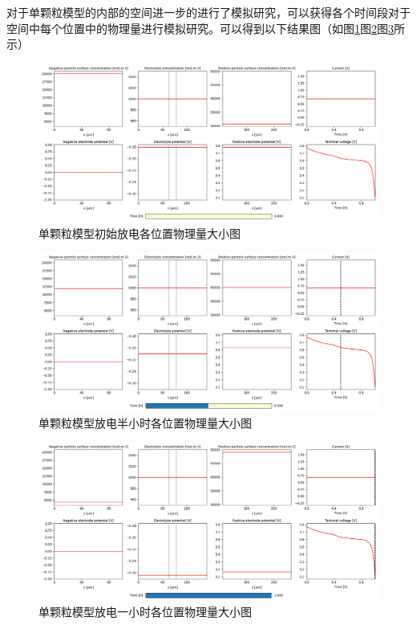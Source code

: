 \documentclass[12pt]{ctexart}%
\begin{document}
对于单颗粒模型的内部的空间进一步的进行了模拟研究，可以获得各个时间段对于空间中每个位置中的物理量进行模拟研究。可以得到以下结果图（如图\ref{d}图\ref{f}图\ref{g}所示）
\begin{figure}[h]
	\centering
	\includegraphics[scale = 0.4]{SPM0}
	\caption{单颗粒模型初始放电各位置物理量大小图}
	\label{d}
\end{figure}

\begin{figure}[H]
	\centering
	\includegraphics[scale = 0.4]{SPM2}
	\caption{单颗粒模型放电半小时各位置物理量大小图}
	\label{f}
\end{figure}

\begin{figure}[H]
	\centering
	\includegraphics[scale = 0.4]{SPM1}
	\caption{单颗粒模型放电一小时各位置物理量大小图}
	\label{g}
\end{figure}
\end{document}
